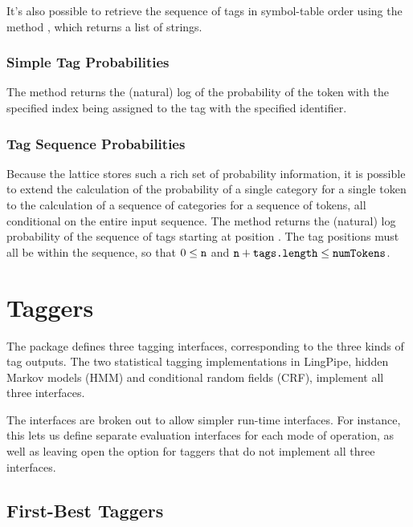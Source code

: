It's also possible to retrieve the sequence of tags in symbol-table
order using the method , which returns a list of strings.

\subsubsection{Simple Tag Probabilities}

The method  returns the
(natural) log of the probability of the token with the specified index
being assigned to the tag with the specified identifier.

\subsubsection{Tag Sequence Probabilities}

Because the lattice stores such a rich set of probability information,
it is possible to extend the calculation of the probability of a
single category for a single token to the calculation of a sequence of
categories for a sequence of tokens, all conditional on the entire
input sequence.  The method 
returns the (natural) log probability of the sequence of tags starting
at position .  The tag positions must all be within the
sequence, so that $0 \leq \mbox{{\ttfamily n}}$ and $\mbox{{\ttfamily n}} +
\mbox{{\ttfamily tags.length}} \leq \mbox{{\ttfamily numTokens}}$.  


\section{Taggers}

The  package defines three tagging interfaces,
corresponding to the three kinds of tag outputs.  The two statistical
tagging implementations in LingPipe, hidden Markov models (HMM) and
conditional random fields (CRF), implement all three interfaces.  

The interfaces are broken out to allow simpler run-time interfaces.
For instance, this lets us define separate evaluation interfaces for
each mode of operation, as well as leaving open the option for
taggers that do not implement all three interfaces.

\subsection{First-Best Taggers}

